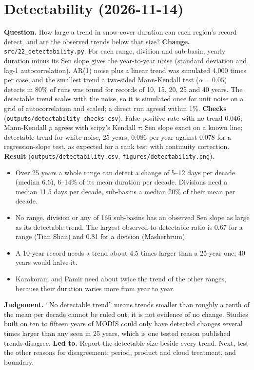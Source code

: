 \documentclass[11pt,a4paper]{article}
\begin{document}
\section{Detectability (2026-11-14)}
\textbf{Question.} How large a trend in snow-cover duration can each region's record detect, and are the observed
trends below that size?
\textbf{Change.} \texttt{src/22\_detectability.py}. For each range, division and sub-basin, yearly duration minus its
Sen slope gives the year-to-year noise (standard deviation and lag-1 autocorrelation). AR(1) noise plus a linear trend
was simulated 4,000 times per case, and the smallest trend a two-sided Mann-Kendall test ($\alpha=0.05$) detects in 80\%
of runs was found for records of 10, 15, 20, 25 and 40 years. The detectable trend scales with the noise, so it is
simulated once for unit noise on a grid of autocorrelation and scaled; a direct run agreed within 1\%.
\textbf{Checks} (\texttt{outputs/detectability\_checks.csv}). False positive rate with no trend 0.046; Mann-Kendall
$p$ agrees with scipy's Kendall $\tau$; Sen slope exact on a known line; detectable trend for white noise, 25 years,
0.086 per year against 0.078 for a regression-slope test, as expected for a rank test with continuity correction.
\textbf{Result} (\texttt{outputs/detectability.csv}, \texttt{figures/detectability.png}).
\begin{itemize}
\item Over 25 years a whole range can detect a change of 5--12 days per decade (median 6.6), 6--14\% of its mean
duration per decade. Divisions need a median 11.5 days per decade, sub-basins a median 20\% of their mean per decade.
\item No range, division or any of 165 sub-basins has an observed Sen slope as large as its detectable trend. The
largest observed-to-detectable ratio is 0.67 for a range (Tian Shan) and 0.81 for a division (Masherbrum).
\item A 10-year record needs a trend about 4.5 times larger than a 25-year one; 40 years would halve it.
\item Karakoram and Pamir need about twice the trend of the other ranges, because their duration varies more
from year to year.
\end{itemize}
\textbf{Judgement.} ``No detectable trend'' means trends smaller than roughly a tenth of the mean per decade cannot be
ruled out; it is not evidence of no change. Studies built on ten to fifteen years of MODIS could only have detected
changes several times larger than any seen in 25 years, which is one tested reason published trends disagree.
\textbf{Led to.} Report the detectable size beside every trend. Next, test the other reasons for disagreement: period,
product and cloud treatment, and boundary.
\end{document}
